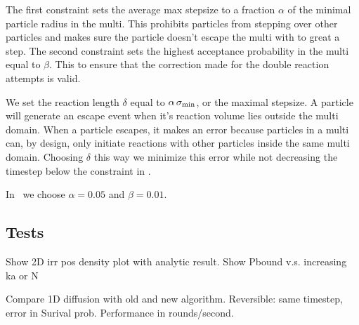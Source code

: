 The first constraint sets the average max stepsize to a fraction $\alpha$ of the minimal particle radius in the multi. This prohibits particles from stepping over other particles and makes sure the particle doesn't escape the multi with to great a step. The second constraint sets the highest acceptance probability in the multi equal to $\beta$. This to ensure that the correction made for the double reaction attempts is valid. 

We set the reaction length $\delta$ equal to $\alpha \, \sigma_{\rm min}$, or the maximal stepsize. A particle will generate an escape event when it's reaction volume lies outside the multi domain. When a particle escapes, it makes an error because particles in a multi can, by design, only initiate reactions with other particles inside the same multi domain. Choosing $\delta$ this way we minimize this error while not decreasing the timestep below the constraint in .

In \GFRD\, we choose $\alpha = 0.05$ and $\beta = 0.01$.

\subsection{Tests}
Show 2D irr pos density plot with analytic result.
Show Pbound v.s. increasing ka or N

Compare 1D diffusion with old and new algorithm. Reversible: same timestep, error in Surival prob. Performance in rounds/second.